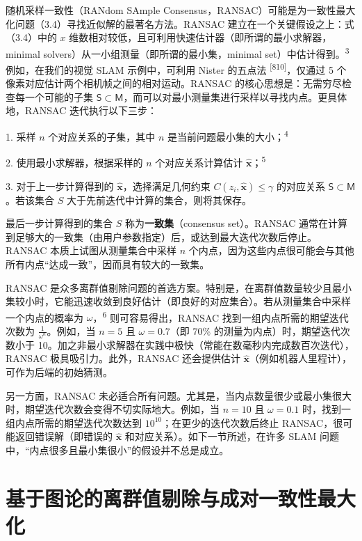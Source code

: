 随机采样一致性（RANdom SAmple Consensus，RANSAC）可能是为一致性最大化问题（3.4）寻找近似解的最著名方法。RANSAC 建立在一个关键假设之上：式（3.4）中的 $x$ 维数相对较低，且可利用快速估计器（即所谓的最小求解器，minimal solvers）从一小组测量（即所谓的最小集，minimal set）中估计得到。\textsuperscript{3} 例如，在我们的视觉 SLAM 示例中，可利用 Nister 的五点法 \textsuperscript{[810]}，仅通过 5 个像素对应估计两个相机帧之间的相对运动。RANSAC 的核心思想是：无需穷尽检查每一个可能的子集 $\mathsf { S } \subset \mathsf { M }$，而可以对最小测量集进行采样以寻找内点。更具体地，RANSAC 迭代执行以下三步：

1. 采样 $n$ 个对应关系的子集，其中 $n$ 是当前问题最小集的大小；\textsuperscript{4}

2. 使用最小求解器，根据采样的 $n$ 个对应关系计算估计 $\hat{\pmb{x}}$；\textsuperscript{5}

3. 对于上一步计算得到的 $\hat{\pmb{x}}$，选择满足几何约束 $C ( z _ { i } , \hat { \pmb x } ) \leq \gamma$ 的对应关系 $ \mathsf { S } \subset \mathsf { M }$。若该集合 $S$ 大于先前迭代中计算的集合，则将其保存。

最后一步计算得到的集合 $S$ 称为\textbf{一致集}（consensus set）。RANSAC 通常在计算到足够大的一致集（由用户参数指定）后，或达到最大迭代次数后停止。RANSAC 本质上试图从测量集合中采样 $n$ 个内点，因为这些内点很可能会与其他所有内点“达成一致”，因而具有较大的一致集。

RANSAC 是众多离群值剔除问题的首选方案。特别是，在离群值数量较少且最小集较小时，它能迅速收敛到良好估计（即良好的对应集合）。若从测量集合中采样一个内点的概率为 $\omega$，\textsuperscript{6} 则可容易得出，RANSAC 找到一组内点所需的期望迭代次数为 $\scriptstyle { \frac { 1 } { \omega ^ { n } } }$。例如，当 $n = 5$ 且 $\omega = 0 . 7$（即 70\% 的测量为内点）时，期望迭代次数小于 10。加之非最小求解器在实践中极快（常能在数毫秒内完成数百次迭代），RANSAC 极具吸引力。此外，RANSAC 还会提供估计 $\hat{\pmb{x}}$（例如机器人里程计），可作为后端的初始猜测。

另一方面，RANSAC 未必适合所有问题。尤其是，当内点数量很少或最小集很大时，期望迭代次数会变得不切实际地大。例如，当 $n = 1 0$ 且 $\omega = 0 . 1$ 时，找到一组内点所需的期望迭代次数达到 $1 0 ^ { 1 0 }$；在更少的迭代次数后终止 RANSAC，很可能返回错误解（即错误的 $\hat{\pmb{x}}$ 和对应关系）。如下一节所述，在许多 SLAM 问题中，“内点很多且最小集很小”的假设并不总是成立。

\section{基于图论的离群值剔除与成对一致性最大化}

